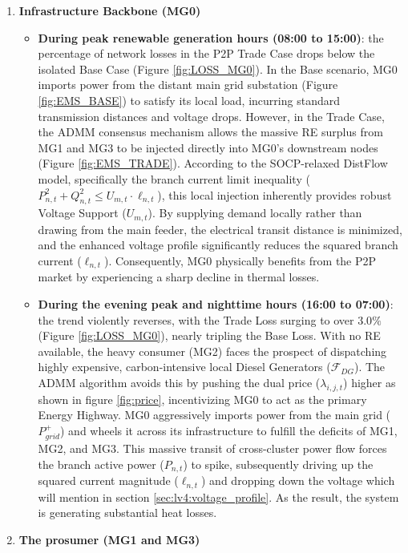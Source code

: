 \documentclass[preprint,12pt]{elsarticle}
\begin{document}
    \begin{enumerate}
        \item \textbf{Infrastructure Backbone (MG0)}
        \begin{itemize}
            \item \textbf{During peak renewable generation hours (08:00 to 15:00)}: the percentage of network losses in the P2P Trade Case drops below the isolated Base Case (Figure \ref{fig:LOSS_MG0}). In the Base scenario, MG0 imports power from the distant main grid substation (Figure \ref{fig:EMS_BASE}) to satisfy its local load, incurring standard transmission distances and voltage drops. However, in the Trade Case, the ADMM consensus mechanism allows the massive RE surplus from MG1 and MG3 to be injected directly into MG0's downstream nodes (Figure \ref{fig:EMS_TRADE}). According to the SOCP-relaxed DistFlow model, specifically the branch current limit inequality ($P_{n,t}^2 + Q_{n,t}^2 \le U_{m,t} \cdot \ell_{n,t}$), this local injection inherently provides robust Voltage Support ($U_{m,t}$). By supplying demand locally rather than drawing from the main feeder, the electrical transit distance is minimized, and the enhanced voltage profile significantly reduces the squared branch current ($\ell_{n,t}$). Consequently, MG0 physically benefits from the P2P market by experiencing a sharp decline in thermal losses. 
            \item \textbf{During the evening peak and nighttime hours (16:00 to 07:00)}: the trend violently reverses, with the Trade Loss surging to over $3.0\%$ (Figure \ref{fig:LOSS_MG0}), nearly tripling the Base Loss. With no RE available, the heavy consumer (MG2) faces the prospect of dispatching highly expensive, carbon-intensive local Diesel Generators ($\mathcal{F}_{DG}$). The ADMM algorithm avoids this by pushing the dual price ($\lambda_{i,j,t}$) higher as shown in figure \ref{fig:price}, incentivizing MG0 to act as the primary Energy Highway. MG0 aggressively imports power from the main grid ($P^+_{grid}$) and wheels it across its infrastructure to fulfill the deficits of MG1, MG2, and MG3. This massive transit of cross-cluster power flow forces the branch active power ($P_{n,t}$) to spike, subsequently driving up the squared current magnitude ($\ell_{n,t}$) and dropping down the voltage which will mention in section \ref{sec:lv4:voltage_profile}. As the result, the system is generating substantial heat losses. 
        \end{itemize}

        \item  \textbf{The prosumer (MG1 and MG3)}  


\end{enumerate}
\end{document}
